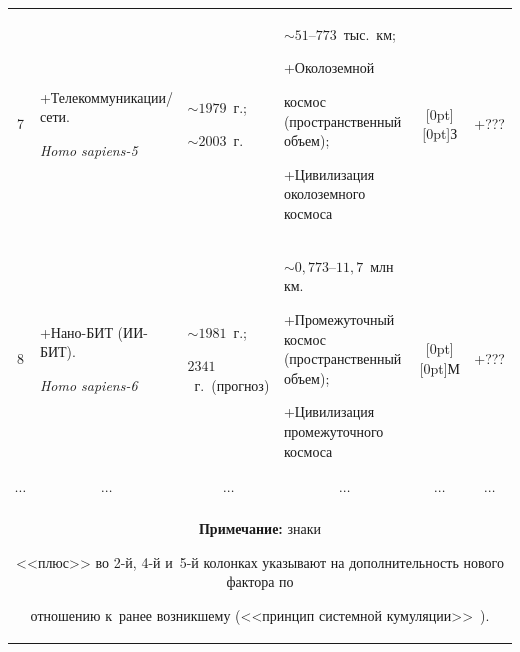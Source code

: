 \begin{enumerate}[1.]
\begin{table}
\begin{center}
\begin{tabular}{|c|p{22mm}|p{30mm}|p{35mm}|c|p{22mm}|}
\cline{1-4}


\cline{6-6}


7&+\;Те\-ле\-ком\-му\-ни\-ка\-ции\!/\!се\-ти.\newline 


\textit{Homo  sapiens-5}&$\sim1979$~г.;\newline 


$\sim 2003$~г.&$\sim 51\mbox{--}773$~тыс.\ км;\newline


 +\;Око\-ло\-зем\-ной 


кос\-мос (про\-стран\-ст\-вен\-ный объ\-ем);\newline  


+\;Ци\-ви\-ли\-за\-ция око\-ло\-зем\-но\-го кос\-мо\-са&


{\raisebox{-30pt}[0pt][0pt]{З}}&+\;???\\


\cline{1-4}


\cline{6-6}


8&+\;Нано-БИТ (ИИ-БИТ).\newline 


\textit{Homo sapiens-6}&$\sim 1981$~г.;\newline


$2341$~г.\ (прогноз)&$\sim 0{,}773\mbox{--}11{,}7$~млн км.\newline 


+\;Про\-ме\-жу\-точ\-ный кос\-мос (про\-стран\-ст\-вен\-ный объем);\newline


 +\;Ци\-ви\-ли\-за\-ция  про\-ме\-жу\-точ\-но\-го кос\-мо\-са&


{\raisebox{-12pt}[0pt][0pt]{М}}&+\;???\\


\hline


$\cdots$&\multicolumn{1}{c|}{$\cdots$}&\multicolumn{1}{c|}{$\cdots$}&\multicolumn{1}{c|}{$\cdots$}&\multicolumn{1}{c|}{$\cdots$}&\multicolumn{1}{c|}{$\cdots$}\\


\hline


\multicolumn{6}{p{126mm}}{\footnotesize \hspace*{2mm}\textbf{Примечание:} знаки 


<<плюс>> во 2-й, 4-й и~5-й колонках указывают на дополнительность нового фактора по 


отношению к~ранее возникшему (<<принцип сис\-тем\-ной кумуляции>>~\cite{6-gri}).}\\



\end{tabular}
\end{center}
\end{table}
\end{enumerate}
